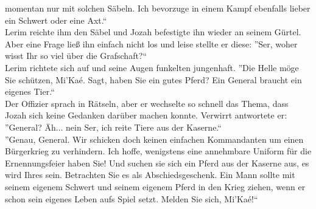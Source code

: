 momentan nur mit solchen Säbeln. Ich bevorzuge in einem Kampf ebenfalls lieber ein Schwert oder 
eine Axt.``\\
Lerim reichte ihm den Säbel und Jozah befestigte ihn wieder an seinem Gürtel. Aber eine Frage ließ 
ihn einfach nicht los und leise stellte er diese: ''Ser, woher wisst Ihr so viel über die 
Grafschaft?``\\
Lerim richtete sich auf und seine Augen funkelten jungenhaft. ''Die Helle möge Sie schützen, 
Mi'Kaé. Sagt, haben Sie ein gutes Pferd? Ein General braucht ein eigenes Tier.``\\
Der Offizier sprach in Rätseln, aber er wechselte so schnell das Thema, dass Jozah sich keine 
Gedanken darüber machen konnte. Verwirrt antwortete er: ''General? Äh... nein Ser, ich reite 
Tiere aus der Kaserne.``\\
''Genau, General. Wir schicken doch keinen einfachen Kommandanten um einen Bürgerkrieg zu 
verhindern. Ich hoffe, wenigstens eine annehmbare Uniform für die Ernennungsfeier haben Sie! Und 
suchen sie sich ein Pferd aus der Kaserne aus, es wird Ihres sein. Betrachten Sie es als 
Abschiedsgeschenk. Ein Mann sollte mit seinem eigenem Schwert und seinem eigenem Pferd in den Krieg 
ziehen, wenn er schon sein eigenes Leben aufs Spiel setzt. Melden Sie sich, Mi'Kaé!`` \\


